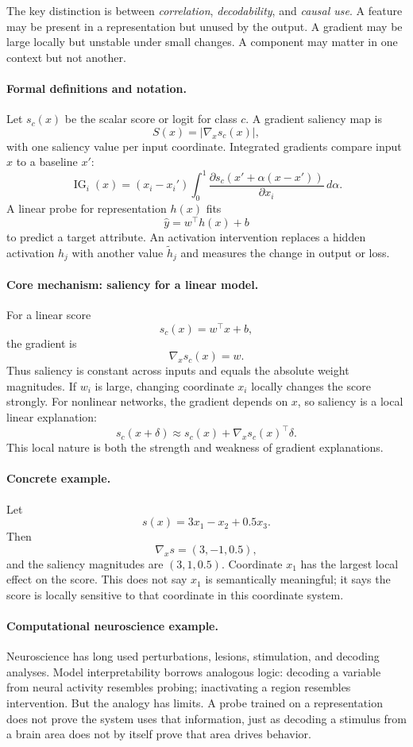 The key distinction is between \emph{correlation}, \emph{decodability}, and \emph{causal use}. A feature may be present in a representation but unused by the output. A gradient may be large locally but unstable under small changes. A component may matter in one context but not another.

\paragraph{Formal definitions and notation.}
Let \(s_c(x)\) be the scalar score or logit for class \(c\). A gradient saliency map is
\[
S(x)=\left|\nabla_x s_c(x)\right|,
\]
with one saliency value per input coordinate. Integrated gradients compare input \(x\) to a baseline \(x'\):
\[
\operatorname{IG}_i(x)
=(x_i-x_i')\int_0^1
\frac{\partial s_c(x'+\alpha(x-x'))}{\partial x_i}\,d\alpha.
\]
A linear probe for representation \(h(x)\) fits
\[
\widehat y=w^\top h(x)+b
\]
to predict a target attribute. An activation intervention replaces a hidden activation \(h_j\) with another value \(\widetilde h_j\) and measures the change in output or loss.

\paragraph{Core mechanism: saliency for a linear model.}
For a linear score
\[
s_c(x)=w^\top x+b,
\]
the gradient is
\[
\nabla_x s_c(x)=w.
\]
Thus saliency is constant across inputs and equals the absolute weight magnitudes. If \(w_i\) is large, changing coordinate \(x_i\) locally changes the score strongly. For nonlinear networks, the gradient depends on \(x\), so saliency is a local linear explanation:
\[
s_c(x+\delta)\approx s_c(x)+\nabla_x s_c(x)^\top\delta.
\]
This local nature is both the strength and weakness of gradient explanations.

\paragraph{Concrete example.}
Let
\[
s(x)=3x_1-x_2+0.5x_3.
\]
Then
\[
\nabla_x s=(3,-1,0.5),
\]
and the saliency magnitudes are \((3,1,0.5)\). Coordinate \(x_1\) has the largest local effect on the score. This does not say \(x_1\) is semantically meaningful; it says the score is locally sensitive to that coordinate in this coordinate system.

\paragraph{Computational neuroscience example.}
Neuroscience has long used perturbations, lesions, stimulation, and decoding analyses. Model interpretability borrows analogous logic: decoding a variable from neural activity resembles probing; inactivating a region resembles intervention. But the analogy has limits. A probe trained on a representation does not prove the system uses that information, just as decoding a stimulus from a brain area does not by itself prove that area drives behavior.


